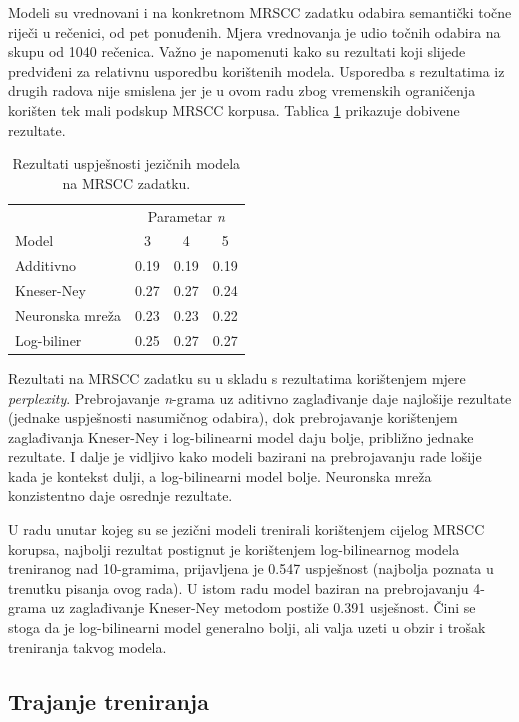 \documentclass[times, utf8, diplomski, numeric]{fer}
\begin{document}
Modeli su vrednovani i na konkretnom MRSCC zadatku odabira semantički točne riječi u rečenici, od pet ponuđenih. Mjera vrednovanja je udio točnih odabira na skupu od 1040 rečenica. Važno je napomenuti kako su rezultati koji slijede predviđeni za relativnu usporedbu korištenih modela. Usporedba s rezultatima iz drugih radova nije smislena jer je u ovom radu zbog vremenskih ograničenja korišten tek mali podskup MRSCC korpusa. Tablica \ref{tbl:eval_mrscc} prikazuje dobivene rezultate.

\begin{table}[htb]
\caption{Rezultati uspješnosti jezičnih modela na MRSCC zadatku.}
\label{tbl:eval_mrscc}
\centering
\begin{tabular}{lccc}
\toprule
 & \multicolumn{3}{c}{Parametar \textit{n}} \\
\cmidrule(r){2-4}
Model & 3 & 4 & 5 \\
\midrule
Additivno &  0.19 & 0.19 & 0.19 \\
Kneser-Ney & 0.27 & 0.27 & 0.24 \\
Neuronska mreža & 0.23 & 0.23 & 0.22 \\
Log-biliner & 0.25 & 0.27 & 0.27 \\
\bottomrule
\end{tabular}
\end{table}

Rezultati na MRSCC zadatku su u skladu s rezultatima korištenjem mjere \textit{perplexity}. Prebrojavanje \textit{n}-grama uz aditivno zaglađivanje daje najlošije rezultate (jednake uspješnosti nasumičnog odabira), dok prebrojavanje korištenjem zaglađivanja Kneser-Ney i log-bilinearni model daju bolje, približno jednake rezultate. I dalje je vidljivo kako modeli bazirani na prebrojavanju rade lošije kada je kontekst dulji, a log-bilinearni model bolje. Neuronska mreža konzistentno daje osrednje rezultate.

U radu unutar kojeg su se jezični modeli trenirali korištenjem cijelog MRSCC korupsa, najbolji rezultat postignut je korištenjem log-bilinearnog modela treniranog nad 10-gramima, prijavljena je 0.547 uspješnost (najbolja poznata u trenutku pisanja ovog rada). U istom radu model baziran na prebrojavanju 4-grama uz zaglađivanje Kneser-Ney metodom postiže 0.391 usješnost. Čini se stoga da je log-bilinearni model generalno bolji, ali valja uzeti u obzir i trošak treniranja takvog modela.

\subsection{Trajanje treniranja}
\end{document}
